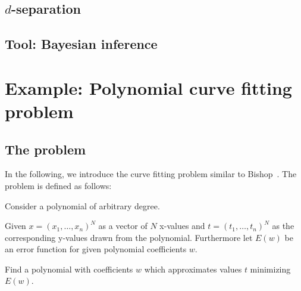 \subsection[d-separation]{$d$-separation}
\label{sec:gm-d-separation}
%


\subsection{Tool: Bayesian inference}




\section{Example: Polynomial curve fitting problem}
\label{sec:bp-curve-fitting}
%
\subsection{The problem}
%

In the following, we introduce the curve fitting problem similar to Bishop~\cite[p.~4~ff.]{Bishop}.
The problem is defined as follows:

\begin{problem}
  Consider a polynomial of arbitrary degree.

  \begin{description}
  \item{Given}
  $x = (x_1, \ldots, x_n)^N$ as a vector of $N$ x-values and
  $t = (t_1, \ldots, t_n)^N$ as the corresponding y-values drawn from the polynomial.
  Furthermore let $E(w)$ be an error function for given polynomial coefficients $w$.

  \item{Find}
  a polynomial with coefficients $w$ which approximates values $t$ minimizing $E(w)$.
  \end{description}
\end{problem}

